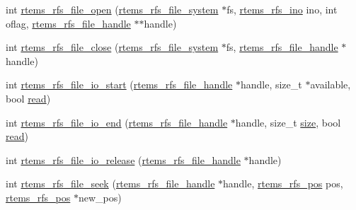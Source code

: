 \begin{DoxyCompactItemize}
\item 
int \mbox{\hyperlink{rtems-rfs-file_8h_a9cffe1fcb5e933e4eaf6eb65161ac9d7}{rtems\+\_\+rfs\+\_\+file\+\_\+open}} (\mbox{\hyperlink{struct__rtems__rfs__file__system}{rtems\+\_\+rfs\+\_\+file\+\_\+system}} $\ast$fs, \mbox{\hyperlink{rtems-rfs-inode_8h_ae658325c3ff9941f2e68315d20e3c723}{rtems\+\_\+rfs\+\_\+ino}} ino, int oflag, \mbox{\hyperlink{rtems-rfs-file_8h_a35a0f4ad45bd35ea0af7df0aa0ad893b}{rtems\+\_\+rfs\+\_\+file\+\_\+handle}} $\ast$$\ast$handle)
\item 
int \mbox{\hyperlink{rtems-rfs-file_8h_a41fc4f3d47394892b567a5e1d0dd35a6}{rtems\+\_\+rfs\+\_\+file\+\_\+close}} (\mbox{\hyperlink{struct__rtems__rfs__file__system}{rtems\+\_\+rfs\+\_\+file\+\_\+system}} $\ast$fs, \mbox{\hyperlink{rtems-rfs-file_8h_a35a0f4ad45bd35ea0af7df0aa0ad893b}{rtems\+\_\+rfs\+\_\+file\+\_\+handle}} $\ast$handle)
\item 
int \mbox{\hyperlink{rtems-rfs-file_8h_a95a9fbf77d3ac355c21ac263db639439}{rtems\+\_\+rfs\+\_\+file\+\_\+io\+\_\+start}} (\mbox{\hyperlink{rtems-rfs-file_8h_a35a0f4ad45bd35ea0af7df0aa0ad893b}{rtems\+\_\+rfs\+\_\+file\+\_\+handle}} $\ast$handle, size\+\_\+t $\ast$available, bool \mbox{\hyperlink{libcsupport_2src_2read_8c_a26d4711c05afec4c7771c3d17b2db9e9}{read}})
\item 
int \mbox{\hyperlink{rtems-rfs-file_8h_ae8539cb85352152dd9b0b5f4a756c092}{rtems\+\_\+rfs\+\_\+file\+\_\+io\+\_\+end}} (\mbox{\hyperlink{rtems-rfs-file_8h_a35a0f4ad45bd35ea0af7df0aa0ad893b}{rtems\+\_\+rfs\+\_\+file\+\_\+handle}} $\ast$handle, size\+\_\+t \mbox{\hyperlink{sun4u_2tte_8h_a245260f6f74972558f61b85227df5aae}{size}}, bool \mbox{\hyperlink{libcsupport_2src_2read_8c_a26d4711c05afec4c7771c3d17b2db9e9}{read}})
\item 
int \mbox{\hyperlink{rtems-rfs-file_8h_a26077ee233df41e872ae47429fb66d40}{rtems\+\_\+rfs\+\_\+file\+\_\+io\+\_\+release}} (\mbox{\hyperlink{rtems-rfs-file_8h_a35a0f4ad45bd35ea0af7df0aa0ad893b}{rtems\+\_\+rfs\+\_\+file\+\_\+handle}} $\ast$handle)
\item 
int \mbox{\hyperlink{rtems-rfs-file_8h_aa6a37c884a77b1399e00425cdf1a864e}{rtems\+\_\+rfs\+\_\+file\+\_\+seek}} (\mbox{\hyperlink{rtems-rfs-file_8h_a35a0f4ad45bd35ea0af7df0aa0ad893b}{rtems\+\_\+rfs\+\_\+file\+\_\+handle}} $\ast$handle, \mbox{\hyperlink{rtems-rfs-file-system_8h_ae6adc04fe673c46403605d64f16699bd}{rtems\+\_\+rfs\+\_\+pos}} pos, \mbox{\hyperlink{rtems-rfs-file-system_8h_ae6adc04fe673c46403605d64f16699bd}{rtems\+\_\+rfs\+\_\+pos}} $\ast$new\+\_\+pos)
$$
\end{DoxyCompactItemize}
